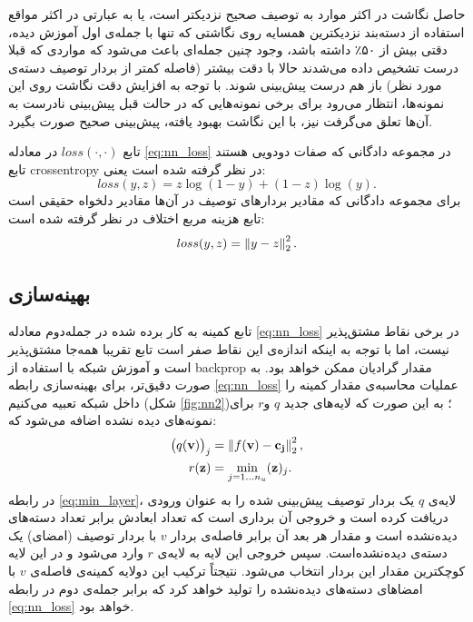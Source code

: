  حاصل نگاشت در اکثر موارد به توصیف صحیح نزدیکتر است، یا به عبارتی در اکثر مواقع استفاده از دسته‌بند نزدیکترین همسایه روی نگاشتی که تنها با جمله‌ی اول آموزش دیده، دقتی بیش از ۵۰٪ داشته باشد، وجود چنین جمله‌ای باعث می‌شود که مواردی که قبلا درست تشخیص داده می‌شدند حالا با دقت بیشتر (فاصله کمتر از بردار توصیف دسته‌ی مورد نظر) باز هم درست پیش‌بینی شوند. با توجه به افزایش دقت نگاشت روی این نمونه‌ها، انتظار می‌رود برای برخی نمونه‌هایی که در حالت قبل پیش‌بینی نادرست به آن‌ها تعلق می‌گرفت نیز، با این نگاشت بهبود یافته، پیش‌بینی صحیح صورت بگیرد.

 تابع $loss(\cdot, \cdot)$ در معادله \eqref{eq:nn_loss} در مجموعه دادگانی که صفات دودویی هستند تابع \gls{crossentropy} در نظر گرفته شده است یعنی:
 \begin{equation}
 loss(y,z) = z \log(1-y) + (1-z) \log(y).
 \end{equation}
 برای مجموعه دادگانی که مقادیر بردارهای توصیف در آن‌ها مقادیر دلخواه حقیقی است تابع هزینه مربع اختلاف در نظر گرفته شده است:
 \begin{equation}
 loss(y,z) = \left \lVert y-z \right \rVert_2^2.
 \end{equation}
 \subsection{بهینه‌سازی }\label{opt_nn}

 تابع کمینه به کار برده شده در جمله‌دوم معادله
\eqref{eq:nn_loss}
در برخی نقاط مشتق‌پذیر نیست، اما با توجه به اینکه اندازه‌ی این نقاط صفر است تابع تقریبا همه‌جا مشتق‌پذیر است و آموزش شبکه با استفاده از \gls{backprop}
 مقدار گرادیان ممکن خواهد بود. به صورت دقیق‌تر، برای بهینه‌سازی رابطه \eqref{eq:nn_loss} عملیات محاسبه‌ی مقدار کمینه را داخل شبکه تعبیه می‌کنیم (شکل \ref{fig:nn2})؛ به این صورت که لایه‌های جدید $q$ و$r$ برای نمونه‌های دیده نشده اضافه می‌شود که:
\begin{align}
\label{eq:min_layer}
\big(q(\mathbf{v})\big )_j &=  \left \lVert f(\mathbf{v) - c_j} \right \rVert_2^2, \\
r(\mathbf{z}) &= \min_{j=1\ldots n_u} (\mathbf{z})_j.
\end{align}
در رابطه \eqref{eq:min_layer}، لایه‌ی $q$ یک بردار توصیف پیش‌بینی شده را به عنوان ورودی دریافت کرده است و خروجی آن برداری است که تعداد ابعادش برابر تعداد دسته‌های دیده‌نشده است و مقدار هر بعد آن برابر فاصله‌ی بردار $v$ با بردار توصیف (امضای) یک دسته‌ی دیده‌نشده‌است.
 سپس خروجی این لایه به لایه‌ی $r$ وارد می‌شود و در این لایه کوچکترین مقدار این بردار انتخاب می‌شود. نتیجتاً ترکیب این دولایه کمینه‌ی فاصله‌ی $v$ با امضاهای دسته‌های دیده‌نشده را تولید خواهد کرد که برابر جمله‌ی دوم در رابطه \eqref{eq:nn_loss} خواهد بود.

